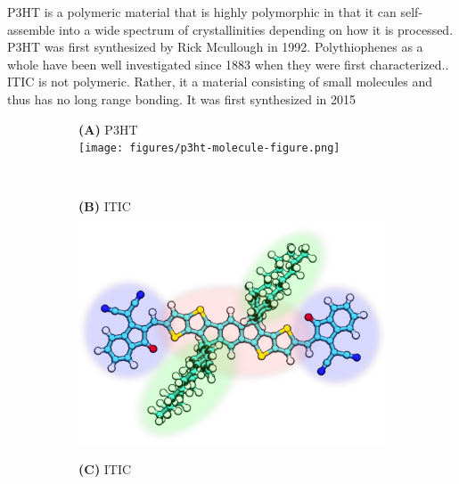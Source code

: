 P3HT is a polymeric material that is highly polymorphic in that it can self-assemble into a wide spectrum of
crystallinities depending on how it is processed. 
P3HT was first synthesized by Rick Mcullough in 1992. Polythiophenes as a whole have been well investigated 
since 1883 when they were first characterized.\cite{Poelking2014}.
ITIC is not polymeric. Rather, it a material consisting of small molecules and thus has no long range bonding.
It was first synthesized in 2015 \cite{Bai201U}

\begin{figure}[]
\centering
\begin{subfigure}{\textwidth}
    \centering
    \textbf{(A)} P3HT \\
    \texttt{[image: figures/p3ht-molecule-figure.png]}
    \newline
\end{subfigure}%
\\
\begin{subfigure}{.5\textwidth}
    \textbf{(B)} ITIC
    \centering
    \includegraphics[width=\textwidth]{figures/itic-backbone-figure.png}
\end{subfigure}%
\begin{subfigure}{.5\textwidth}
    \textbf{(C)} ITIC
    \centering

\end{subfigure}
\end{figure}
